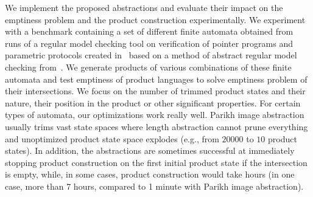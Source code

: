 We implement the proposed abstractions and evaluate their impact on the emptiness problem and the product construction experimentally. We experiment with a benchmark containing a set of different finite automata obtained from runs of a regular model checking tool on verification of pointer programs and parametric protocols created in~\cite{model_checking_tool_10.1007/978-3-540-70844-5_7} based on a method of abstract regular model checking from~\cite{method_model_checking_tool}. We generate products of various combinations of these finite automata and test emptiness of product languages to solve emptiness problem of their intersections. We focus on the number of trimmed product states and their nature, their position in the product or other significant properties. For certain types of automata, our optimizations work really well. Parikh image abstraction usually trims vast state spaces where length abstraction cannot prune everything and unoptimized product state space explodes (e.g., from $20000$ to $10$ product states). In addition, the abstractions are sometimes successful at immediately stopping product construction on the first initial product state if the intersection is empty, while, in some cases, product construction would take hours (in one case, more than 7 hours, compared to 1 minute with Parikh image abstraction).

